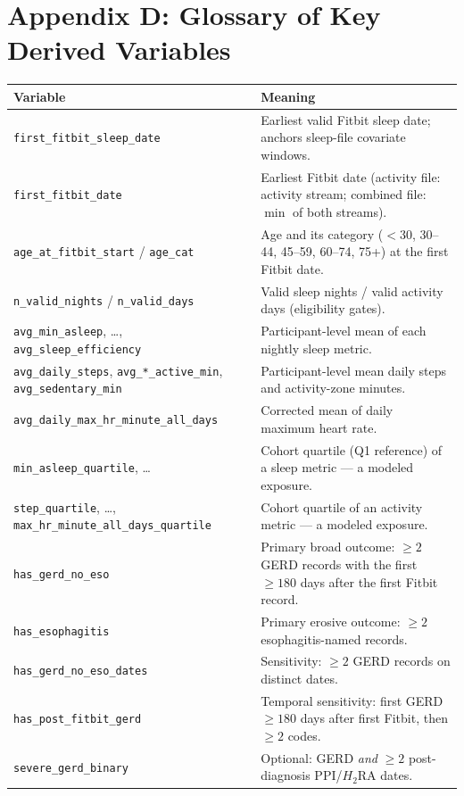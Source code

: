 \documentclass[11pt]{article}
\newcommand{\code}[1]{\texttt{\small #1}}
\begin{document}
\section{Appendix D: Glossary of Key Derived Variables}
\begin{longtable}{@{}p{5.2cm}p{8.3cm}@{}}
\toprule
\textbf{Variable} & \textbf{Meaning} \\
\midrule
\endhead
\code{first_fitbit_sleep_date} & Earliest valid Fitbit sleep date; anchors sleep-file covariate windows. \\
\code{first_fitbit_date} & Earliest Fitbit date (activity file: activity stream; combined file: $\min$ of both streams). \\
\code{age_at_fitbit_start} / \code{age_cat} & Age and its category ($<$30, 30--44, 45--59, 60--74, 75+) at the first Fitbit date. \\
\code{n_valid_nights} / \code{n_valid_days} & Valid sleep nights / valid activity days (eligibility gates). \\
\code{avg_min_asleep}, \ldots, \code{avg_sleep_efficiency} & Participant-level mean of each nightly sleep metric. \\
\code{avg_daily_steps}, \code{avg_*_active_min}, \code{avg_sedentary_min} & Participant-level mean daily steps and activity-zone minutes. \\
\code{avg_daily_max_hr_minute_all_days} & Corrected mean of daily maximum heart rate. \\
\code{min_asleep_quartile}, \ldots & Cohort quartile (Q1 reference) of a sleep metric --- a modeled exposure. \\
\code{step_quartile}, \ldots, \code{max_hr_minute_all_days_quartile} & Cohort quartile of an activity metric --- a modeled exposure. \\
\code{has_gerd_no_eso} & Primary broad outcome: $\geq 2$ GERD records with the first $\geq 180$ days after the first Fitbit record. \\
\code{has_esophagitis} & Primary erosive outcome: $\geq 2$ esophagitis-named records. \\
\code{has_gerd_no_eso_dates} & Sensitivity: $\geq 2$ GERD records on distinct dates. \\
\code{has_post_fitbit_gerd} & Temporal sensitivity: first GERD $\geq 180$ days after first Fitbit, then $\geq 2$ codes. \\
\code{severe_gerd_binary} & Optional: GERD \emph{and} $\geq 2$ post-diagnosis PPI/$H_2$RA dates. \\

\end{longtable}
\end{document}
